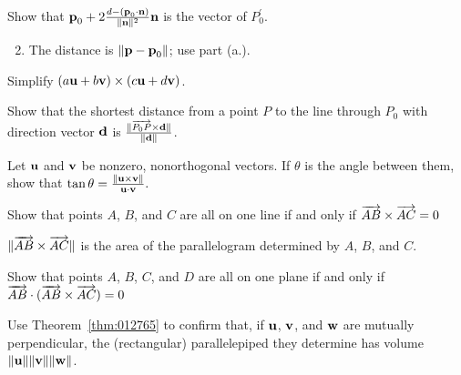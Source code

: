 \begin{multicols}{2}
\begin{ex}
\begin{enumerate}[label={\alph*.}]
Show that $\textbf{p}_{0} + 2\tfrac{d - (\textbf{p}_{0} \cdot \textbf{n})}{\| \textbf{n} \|^2}\textbf{n}$ is the vector of $P_{0}^\prime$.

\end{enumerate}
\begin{sol}
\begin{enumerate}[label={\alph*.}]
\setcounter{enumi}{1}
\item  The distance is $\|\textbf{p} - \textbf{p}_{0}\|$; use part (a.).

\end{enumerate}
\end{sol}
\end{ex}

\begin{ex}
Simplify $(a\textbf{u} + b\textbf{v}) \times (c\textbf{u} + d\textbf{v})$.
\end{ex}

\begin{ex}
Show that the shortest distance from a point $P$ to the line through $P_{0}$ with direction vector $\textbf{d}$ is $\tfrac{\| \overrightarrow{P_{0}P} \times \textbf{d} \|}{\| \textbf{d} \|}$.
\end{ex}

\begin{ex}
Let $\textbf{u}$ and $\textbf{v}$ be nonzero, nonorthogonal vectors. If $\theta$ is the angle between them, show that $\tan\theta = \tfrac{\| \textbf{u} \times \textbf{v} \|}{\textbf{u} \cdot \textbf{v}}.$
\end{ex}

\begin{ex}
Show that points $A$, $B$, and $C$ are all on one line if and only if $\overrightarrow{AB} \times \overrightarrow{AC} = 0$


\begin{sol}
$\| \overrightarrow{AB} \times \overrightarrow{AC} \|$ is the area of the parallelogram determined by $A$, $B$, and $C$.
\end{sol}
\end{ex}

\begin{ex}
Show that points $A$, $B$, $C$, and $D$ are all on one plane if and only if  $\overrightarrow{AB} \cdot (\overrightarrow{AB} \times \overrightarrow{AC}) = 0$
\end{ex}

\begin{ex}
Use Theorem~\ref{thm:012765} to confirm that, if $\textbf{u}$, $\textbf{v}$, and $\textbf{w}$ are mutually perpendicular, the (rectangular) parallelepiped they determine has volume $\|\textbf{u}\|\|\textbf{v}\|\|\textbf{w}\|$.


\end{ex}
\end{multicols}
